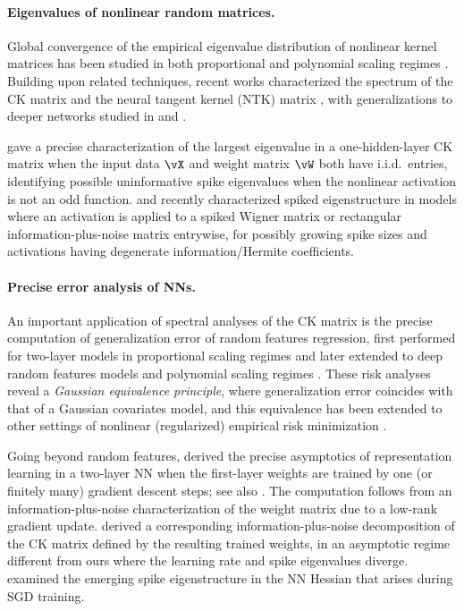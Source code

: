 \paragraph{Eigenvalues of nonlinear random matrices.} 
Global convergence of the empirical eigenvalue distribution of
nonlinear kernel matrices has been studied in both proportional and polynomial
scaling regimes
\citep{el2010spectrum,cheng2013spectrum,fan2019spectral,lu2022equivalence,dubova2023universality}.
Building upon related techniques, recent works characterized the spectrum of the
CK matrix \citep{pennington2017nonlinear,louart2018random,peche2019note} and the
neural tangent kernel (NTK) matrix
\citep{montanari2020interpolation,adlam2020neural}, with generalizations to
deeper networks studied in \cite{fan2020spectra} and \cite{chouard2023deterministic}. 

\cite{benigni2022largest} gave a precise characterization
of the largest eigenvalue in a one-hidden-layer CK matrix when the input data
$\vX$ and weight matrix $\vW$ both have i.i.d.~entries, identifying possible
uninformative spike eigenvalues when the nonlinear activation is not an odd
function. \cite{guionnet2023spectral} and \cite{feldman2023spectral} recently
characterized spiked eigenstructure in models where an activation is applied to
a spiked Wigner matrix or rectangular information-plus-noise matrix entrywise,
for possibly growing spike sizes and activations having degenerate
information/Hermite coefficients.

\paragraph{Precise error analysis of NNs.} 
An important application of spectral analyses of the CK matrix is the precise
computation of generalization error of random features regression, 
first performed for two-layer models in proportional scaling regimes
\citep{louart2018random,mei2019generalization} and later extended to deep
random features models \citep{schroder2023deterministic,bosch2023precise} and
polynomial scaling regimes \citep{ghorbani2019linearized,xiao2022precise}. 
These risk analyses reveal a \textit{Gaussian equivalence principle}, where
generalization error coincides with that of a Gaussian covariates model,
and this equivalence has been extended to other settings of nonlinear
(regularized) empirical risk minimization 
\citep{hu2020universality,goldt2021gaussian,montanari2022universality}.

Going beyond random features, \cite{ba2022high} derived the
precise asymptotics of representation learning in a two-layer NN when the
first-layer weights are trained by one (or finitely many) gradient descent
steps; see also \cite{damian2022neural,ba2023learning,dandi2023learning}.
The computation follows from an information-plus-noise characterization
of the weight matrix due to a low-rank gradient update. \cite{moniri2023theory}
derived a corresponding information-plus-noise decomposition
of the CK matrix defined by the resulting trained weights, in an asymptotic
regime different from ours where the learning rate and spike eigenvalues
diverge. \cite{arous2023high2} examined the emerging spike
eigenstructure in the NN Hessian that arises during SGD training.

